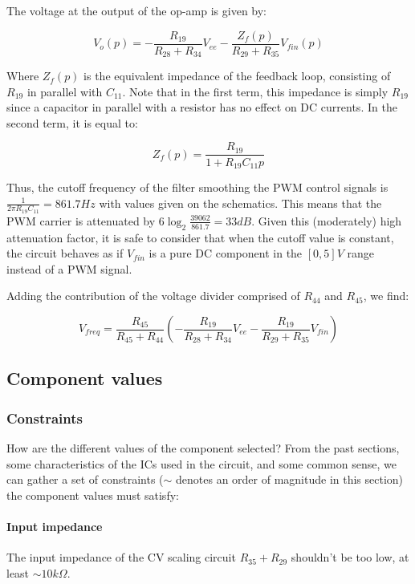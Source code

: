 \documentclass[a4paper,11pt]{article}
\begin{document}
The voltage at the output of the op-amp is given by:

\begin{equation}
V_o(p) = -\frac{R_{19}}{R_{28} + R_{34}} V_{ee} -\frac{Z_f(p)}{R_{29} + R_{35}} V_{fin}(p)
\end{equation}

Where $Z_f(p)$ is the equivalent impedance of the feedback loop, consisting of $R_{19}$ in parallel with $C_{11}$. Note that in the first term, this impedance is simply $R_{19}$ since a capacitor in parallel with a resistor has no effect on DC currents. In the second term, it is equal to:

\begin{equation}
Z_f(p) = \frac{R_{19}}{1 + R_{19}C_{11}p}
\end{equation}

Thus, the cutoff frequency of the filter smoothing the PWM control signals is $\frac{1}{2 \pi R_{19}C_{11}} = 861.7 Hz$ with values given on the schematics. This means that the PWM carrier is attenuated by $6\log_2 \frac{39062}{861.7} = 33dB$. Given this (moderately) high attenuation factor, it is safe to consider that when the cutoff value is constant, the circuit behaves as if $V_{fin}$ is a pure DC component in the $[0, 5]V$ range instead of a PWM signal.

Adding the contribution of the voltage divider comprised of $R_{44}$ and $R_{45}$, we find:

\begin{equation}
V_{freq} = \frac{R_{45}}{R_{45} + R_{44}} \left(-\frac{R_{19}}{R_{28} + R_{34}} V_{ee} -\frac{R_{19}}{R_{29} + R_{35}} V_{fin}\right)
\end{equation}

\subsection{Component values}

\subsubsection{Constraints}

How are the different values of the component selected? From the past sections, some characteristics of the ICs used in the circuit, and some common sense, we can gather a set of constraints ($\sim$ denotes an order of magnitude in this section) the component values must satisfy:

\paragraph{Input impedance} The input impedance of the CV scaling circuit $R_{35} + R_{29}$ shouldn't be too low, at least $\sim 10k \Omega$.
\end{document}
